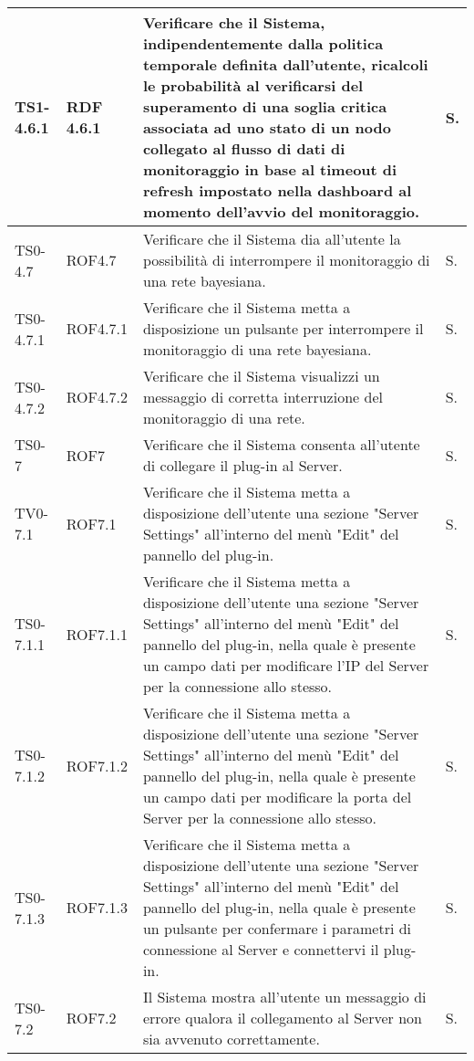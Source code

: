 \begin{longtable}{|C{.15\textwidth}|C{.14\textwidth}|m{.52\textwidth}|m{.08\textwidth}|}
\hline
TS1-4.6.1 & RDF 4.6.1 & Verificare che il Sistema, indipendentemente dalla politica temporale definita dall'utente, ricalcoli le probabilità al verificarsi del superamento di una soglia critica associata ad uno stato di un nodo collegato al flusso di dati di monitoraggio in base al timeout di refresh impostato nella dashboard al momento dell'avvio del monitoraggio. & S. \\
\hline
{}TS0-4.7 & ROF4.7 & Verificare che il Sistema dia all'utente la possibilità di interrompere il monitoraggio di una rete bayesiana. & S. \\
\hline
TS0-4.7.1 & ROF4.7.1 & Verificare che il Sistema metta a disposizione un pulsante per interrompere il monitoraggio di una rete bayesiana. & S. \\
\hline
{}TS0-4.7.2 & ROF4.7.2 & Verificare che il Sistema visualizzi un messaggio di corretta interruzione del monitoraggio di una rete. & S. \\
\hline
TS0-7 & ROF7 & Verificare che il Sistema consenta all'utente di collegare il plug-in al Server. & S. \\
\hline
{}TV0-7.1 & ROF7.1 & Verificare che il Sistema metta a disposizione dell'utente una sezione "Server Settings" all'interno del menù "Edit" del pannello del plug-in. & S. \\
\hline
TS0-7.1.1 & ROF7.1.1 & Verificare che il Sistema metta a disposizione dell'utente una sezione "Server Settings" all'interno del menù "Edit" del pannello del plug-in, nella quale è presente un campo dati per modificare l'IP del Server per la connessione allo stesso. & S. \\
\hline
{}TS0-7.1.2 & ROF7.1.2 & Verificare che il Sistema metta a disposizione dell'utente una sezione "Server Settings" all'interno del menù "Edit" del pannello del plug-in, nella quale è presente un campo dati per modificare la porta del Server per la connessione allo stesso. & S. \\
\hline
TS0-7.1.3 & ROF7.1.3 & Verificare che il Sistema metta a disposizione dell'utente una sezione "Server Settings" all'interno del menù "Edit" del pannello del plug-in, nella quale è presente un pulsante per confermare i parametri di connessione al Server e connettervi il plug-in. & S. \\
\hline
{}TS0-7.2 & ROF7.2 & Il Sistema mostra all'utente un messaggio di errore qualora il collegamento al Server non sia avvenuto correttamente. & S. \\

\end{longtable}
